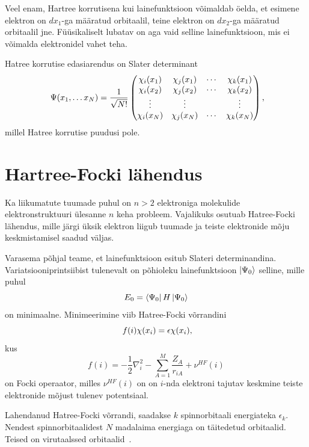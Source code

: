\documentclass[12pt]{report}
\def\ket#1{\mathinner{|#1\rangle}}
\def\bra#1{\mathinner{\langle#1|}}
\begin{document}
Veel enam, Hartree korrutisena kui lainefunktsioon võimaldab öelda, et esimene elektron
on \(dx_1\)-ga määratud orbitaalil, teine elektron on \(dx_2\)-ga määratud orbitaalil jne. Füüsikaliselt lubatav on aga vaid selline lainefunktsioon, mis ei võimalda elektronidel vahet teha.

Hatree korrutise edasiarendus on Slater determinant
\begin{equation}
    \Psi(x_1,\ldots x_N) = \frac{1}{\sqrt{N!}}\begin{pmatrix}
        \chi_i(x_1) & \chi_j(x_1) & \cdots & \chi_k(x_1) \\
        \chi_i(x_2) & \chi_j(x_2) & \cdots & \chi_k(x_2) \\
        \vdots & \vdots & & \vdots \\
        \chi_i(x_N) & \chi_j(x_N) & \cdots & \chi_k(x_N) \\
    \end{pmatrix}\rlap{,}
\end{equation}
millel Hatree korrutise puudusi pole.


\section{Hartree-Focki lähendus}\label{hatree-fock}

Ka liikumatute tuumade puhul on \(n > 2\) elektroniga molekulide elektronstruktuuri ülesanne \(n\) keha probleem.
Vajalikuks osutuab Hatree-Focki lähendus, mille järgi üksik elektron liigub tuumade ja teiste elektronide mõju keskmistamisel saadud väljas.

Varasema põhjal teame, et lainefunktsioon esitub Slateri determinandina.
Variatsiooniprintsiibist tulenevalt on põhioleku lainefunktsioon \(\ket{\Psi_0}\) selline, mille puhul
\begin{equation}
    E_0 = \bra{\Psi_0}H\ket{\Psi_0}
\end{equation}
on minimaalne.
Minimeerimine viib Hatree-Focki võrrandini
\begin{equation}
    f(i)\chi(x_i)=\epsilon\chi(x_i)\rlap{,}
\end{equation}
kus
\begin{equation}
    f(i) = -\frac{1}{2}\nabla_i^2-\sum_{A=1}^M\frac{Z_A}{r_{iA}}+\nu^{HF}(i)
\end{equation}
on Focki operaator, milles \(\nu^{HF}(i)\) on on \(i\)-nda elektroni tajutav keskmine teiste elektronide mõjust tulenev potentsiaal.

Lahendanud Hatree-Focki võrrandi, saadakse \(k\) spinnorbitaali energiateka \(\epsilon_k\).
Nendest spinnorbitaalidest \(N\) madalaima energiaga on täitedetud orbitaalid.
Teised on virutaalssed orbitaalid~\cite{szab0+ostlnud}.
\end{document}
